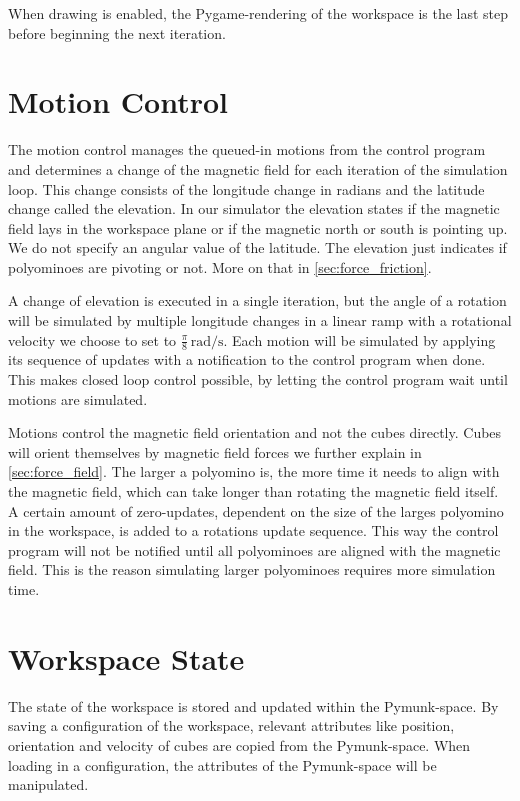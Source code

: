 When drawing is enabled, the Pygame-rendering of the workspace is the last step before beginning the next iteration.


\section{Motion Control}
\label{sec:motion_control}

The motion control manages the queued-in motions from the control program and determines a change of the magnetic field for each iteration of the simulation loop.
This change consists of the longitude change in radians and the latitude change called the elevation.
In our simulator the elevation states if the magnetic field lays in the workspace plane or if the magnetic north or south is pointing up.
We do not specify an angular value of the latitude.
The elevation just indicates if polyominoes are pivoting or not.
More on that in \autoref{sec:force_friction}.

A change of elevation is executed in a single iteration, but the angle of a rotation will be simulated by multiple longitude changes in a linear ramp with a rotational velocity we choose to set to $\frac{\pi}{8} \, \text{rad}/\text{s}$.
Each motion will be simulated by applying its sequence of updates with a notification to the control program when done.
This makes closed loop control possible, by letting the control program wait until motions are simulated.

Motions control the magnetic field orientation and not the cubes directly.
Cubes will orient themselves by magnetic field forces we further explain in \autoref{sec:force_field}.
The larger a polyomino is, the more time it needs to align with the magnetic field, which can take longer than rotating the magnetic field itself.
A certain amount of zero-updates, dependent on the size of the larges polyomino in the workspace, is added to a rotations update sequence.
This way the control program will not be notified until all polyominoes are aligned with the magnetic field.
This is the reason simulating larger polyominoes requires more simulation time.

\section{Workspace State}
\label{sec:workspace_state}

The state of the workspace is stored and updated within the Pymunk-space.
By saving a configuration of the workspace, relevant attributes like position, orientation and velocity of cubes are copied from the Pymunk-space.
When loading in a configuration, the attributes of the Pymunk-space will be manipulated.

